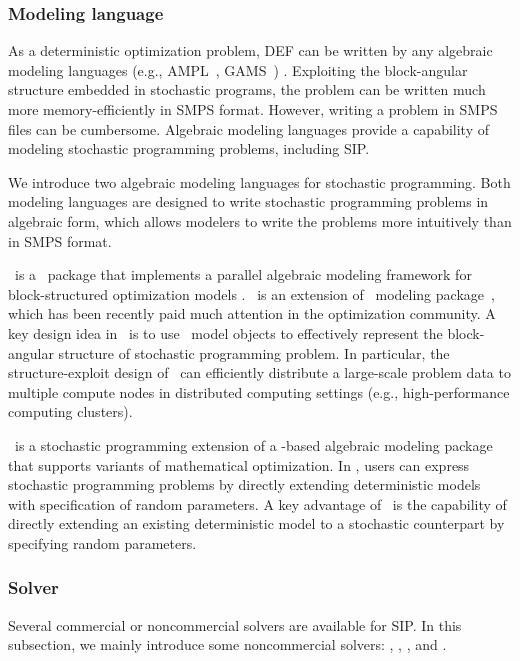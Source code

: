 \subsubsection{Modeling language}

As a deterministic optimization problem, DEF can be written by any algebraic modeling languages (e.g., AMPL~\cite{ampl}, GAMS~\cite{gams}) . Exploiting the block-angular structure embedded in stochastic programs, the problem can be written much more memory-efficiently in SMPS format. However, writing a problem in SMPS files can be cumbersome. Algebraic modeling languages provide a capability of modeling stochastic programming problems, including SIP.

We introduce two algebraic modeling languages for stochastic programming. Both modeling languages are designed to write stochastic programming problems in algebraic form, which allows modelers to write the problems more intuitively than in SMPS format.

\structjump\ is a \julia\ package that implements a parallel algebraic modeling framework for block-structured optimization models \cite{web:StructJuMP}. \structjump\ is an extension of \jump\ modeling package~\cite{journal:JuMP}, which has been recently paid much attention in the optimization community. A key design idea in \structjump\ is to use \jump\ model objects to effectively represent the block-angular structure of stochastic programming problem. In particular, the structure-exploit design of \structjump\ can efficiently distribute a large-scale problem data to multiple compute nodes in distributed computing settings (e.g., high-performance computing clusters).

\pysp\ is a stochastic programming extension of a \python-based algebraic modeling package \pyomo\ \cite{book:pyomo} that supports variants of mathematical optimization. In \pysp, users can express stochastic programming problems by directly extending deterministic models with specification of random parameters. A key advantage of \pysp\ is the capability of directly extending an existing deterministic model to a stochastic counterpart by specifying random parameters. 

\subsubsection{Solver}
Several commercial or noncommercial solvers are available for SIP. In this subsection, we mainly introduce some noncommercial solvers: \pipssbb, \scip, \dsp, and \pysp.

